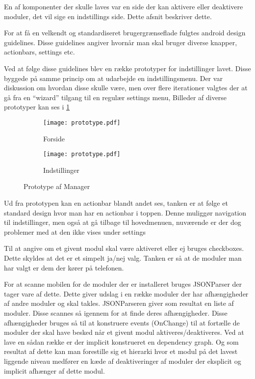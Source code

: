En af komponenter der skulle laves var en side der kan aktivere eller deaktivere moduler, det vil sige en indstillings side. Dette afsnit beskriver dette.

For at få en velkendt og standardiseret brugergrænseflade fulgtes android design guidelines.
Disse guidelines angiver hvornår man skal bruger diverse knapper, actionbars, settings etc.
\cite{androiddesign}

Ved at følge disse guidelines blev en række prototyper for indstillinger lavet.
Disse byggede på samme princip om at udarbejde en indstillingsmenu.
Der var diskussion om hvordan disse skulle være, men over flere iterationer valgtes der at gå fra en ``wizard'' tilgang til en regulær settings menu,
Billeder af diverse prototyper kan ses i \cref{fig:prototype-manager}

\begin{figure}[H]
	\centering
	\begin{subfigure}[b]{0.45\textwidth}
			\texttt{[image: prototype.pdf]}
			\caption{Forside}
	\end{subfigure}
	\begin{subfigure}[b]{0.45\textwidth}
			\texttt{[image: prototype.pdf]}
			\caption{Indstillinger}
	\end{subfigure}
	\caption{Prototype af Manager}
	\label{fig:prototype-manager}
\end{figure}


Ud fra prototypen kan en actionbar blandt andet ses, tanken er at følge et standard design hvor man har en actionbar i toppen.
Denne muliggør navigation til indstillinger, men også at gå tilbage til hovedmenuen, nuværende er der dog problemer med at den ikke vises under settings

Til at angive om et givent modul skal være aktiveret eller ej bruges checkboxes.
Dette skyldes at det er et simpelt ja/nej valg. 
Tanken er så at de moduler man har valgt er dem der kører på telefonen.

For at scanne mobilen for de moduler der er installeret bruges JSONParser der tager vare af dette. 
Dette giver udslag i en række moduler der har afhængigheder af andre moduler og skal takles.
JSONParseren giver som resultat en liste af moduler. Disse scannes så igennem for at finde deres afhængigheder.
Disse afhængigheder bruges så til at konstruere events (OnChange) til at fortælle de moduler der skal have besked når et givent modul aktiveres/deaktiveres.
Ved at lave en sådan række er der implicit konstrueret en dependency graph.
Og som resultat af dette kan man forestille sig et hierarki hvor et modul på det lavest liggende niveau medfører en kæde af deaktiveringer af moduler der eksplicit og implicit afhænger af dette modul.


